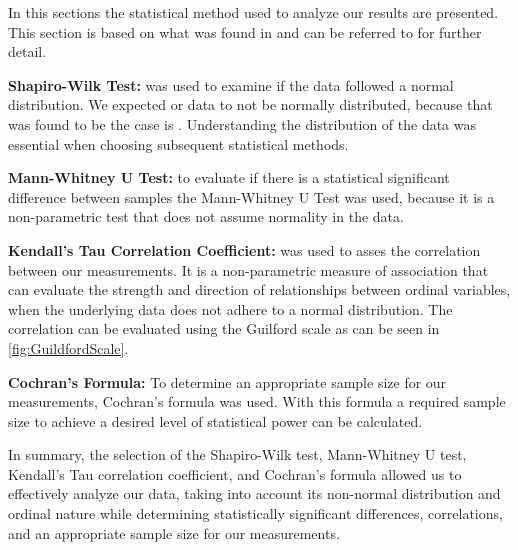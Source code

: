 In this sections the statistical method used to analyze our results are presented. This section is based on what was found in \cite{biksbois} and can be referred to for further detail.\newline %

\noindent\textbf{Shapiro-Wilk Test:} was used to examine if the data followed a normal distribution. %
We expected or data to not be normally distributed, because that was found to be the case is \cite{biksbois}. Understanding the distribution of the data was essential when choosing subsequent statistical methods.\cite{razali2011power}\newline

\noindent\textbf{Mann-Whitney U Test:}
to evaluate if there is a statistical significant difference between samples the Mann-Whitney U Test was used, because it is a non-parametric test that does not assume normality in the data.\cite{mann1947test}\newline


\noindent\textbf{Kendall's Tau Correlation Coefficient:}
was used to asses the correlation between our measurements. It is a non-parametric measure of association that can evaluate the strength and direction of relationships between ordinal variables, when the underlying data does not adhere to a normal distribution.\cite{han1987non} The correlation can be evaluated using the Guilford scale
\cite[219]{guilford1950fundamental} as can be seen in \cref{fig:GuildfordScale}.\newline



\noindent\textbf{Cochran's Formula:}
To determine an appropriate sample size for our measurements, Cochran's formula was used. With this formula a required sample size to achieve a desired level of statistical power can be calculated.\cite{Cochran}\newline

\noindent In summary, the selection of the Shapiro-Wilk test, Mann-Whitney U test, Kendall's Tau correlation coefficient, and Cochran's formula allowed us to effectively analyze our data, taking into account its non-normal distribution and ordinal nature while determining statistically significant differences, correlations, and an appropriate sample size for our measurements.
